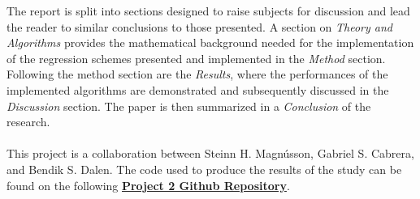     The report is split into sections designed to raise subjects for discussion and lead the reader to similar conclusions to those presented. A section on \textit{Theory and Algorithms} provides the mathematical background needed for the implementation of the regression schemes presented and implemented in the \textit{Method} section. Following the method section are the \textit{Results}, where the performances of the implemented algorithms are demonstrated and subsequently discussed in the \textit{Discussion} section. The paper is then summarized in a \textit{Conclusion} of the research.\\\\
    This project is a collaboration between Steinn H. Magnússon, Gabriel S. Cabrera, and Bendik S. Dalen. The code used to produce the results of the study can be found on the following \href{https://github.com/GabrielSCabrera/MachineLearning/tree/master/FYS-STK4155/Project_2/Gabriel/project}{\textbf{Project 2 Github Repository}}. 